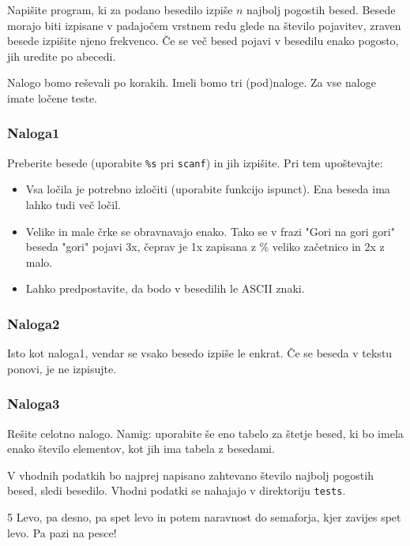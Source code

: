 
\besedilo

Napišite program, ki za podano besedilo izpiše $n$ najbolj pogostih besed.
Besede morajo biti izpisane v padajočem vrstnem redu glede na število
pojavitev, zraven besede izpišite njeno frekvenco. Če se več besed
pojavi v besedilu enako pogosto, jih uredite po abecedi.

Nalogo bomo reševali po korakih. Imeli bomo
tri (pod)naloge. Za vse naloge imate ločene teste.

\subsubsection*{Naloga1}
Preberite besede (uporabite \texttt{\%s} pri \texttt{scanf}) in jih izpišite.
Pri tem upoštevajte:
\begin{itemize}
 \item Vsa ločila je potrebno izločiti (uporabite funkcijo ispunct). Ena beseda
ima lahko tudi več ločil.
 \item Velike in male črke se obravnavajo enako. Tako se
v frazi "Gori na gori gori" beseda "gori" pojavi 3x, čeprav je 1x zapisana z
\% veliko začetnico in 2x z malo.
 \item Lahko predpostavite, da bodo v besedilih le ASCII znaki.
\end{itemize}

\subsubsection*{Naloga2}
Isto kot naloga1, vendar se vsako besedo izpiše le enkrat. Če se beseda v
tekstu ponovi, je ne izpisujte.

\subsubsection*{Naloga3}
Rešite celotno nalogo. Namig: uporabite še eno tabelo za štetje besed, ki bo imela enako število elementov, kot jih ima tabela z besedami.

\vhod

V vhodnih podatkih bo najprej napisano zahtevano število najbolj pogostih besed,
sledi besedilo. Vhodni podatki se nahajajo v direktoriju \texttt{tests}.

\begin{primerVhod}
5
Levo, pa desno, pa spet levo in potem naravnost do semaforja, kjer zavijes spet
levo. Pa pazi na pesce!
\end{primerVhod}

